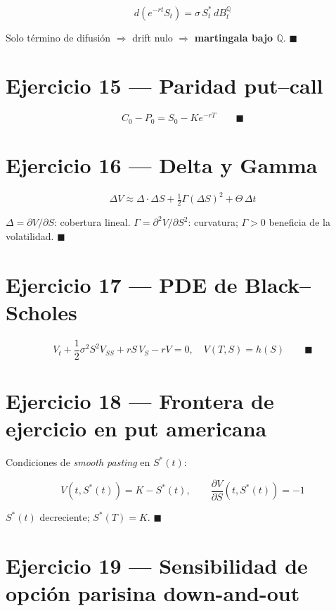 \documentclass[12pt,letterpaper]{article}
\begin{document}
\[
  d(e^{-rt}S_t) = \sigma\,S_t^*\,dB_t^\mathbb{Q}
\]

Solo t\'ermino de difusi\'on $\Rightarrow$ drift nulo $\Rightarrow$
\textbf{martingala bajo $\mathbb{Q}$}. $\blacksquare$

\section*{Ejercicio 15 --- Paridad put--call}

\[
  \boxed{C_0 - P_0 = S_0 - Ke^{-rT}} \qquad \blacksquare
\]

\section*{Ejercicio 16 --- Delta y Gamma}

\[
  \Delta V \approx \Delta\cdot\Delta S + \tfrac{1}{2}\Gamma(\Delta S)^2
    + \Theta\,\Delta t
\]

$\Delta = \partial V/\partial S$: cobertura lineal.
$\Gamma = \partial^2 V/\partial S^2$: curvatura; $\Gamma>0$ beneficia de la
volatilidad. $\blacksquare$

\section*{Ejercicio 17 --- PDE de Black--Scholes}

\begin{equation}
  \boxed{V_t + \frac{1}{2}\sigma^2 S^2 V_{SS} + rS\,V_S - rV = 0,
    \quad V(T,S) = h(S)} \qquad \blacksquare
\end{equation}

\section*{Ejercicio 18 --- Frontera de ejercicio en put americana}

Condiciones de \textit{smooth pasting} en $S^*(t)$:

\[
  V(t, S^*(t)) = K - S^*(t), \qquad
  \frac{\partial V}{\partial S}(t, S^*(t)) = -1
\]

$S^*(t)$ decreciente; $S^*(T) = K$. $\blacksquare$

\section*{Ejercicio 19 --- Sensibilidad de opci\'on parisina down-and-out}
\end{document}
